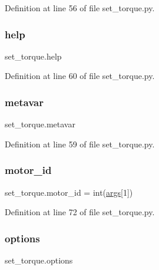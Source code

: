 Definition at line 56 of file set\+\_\+torque.\+py.

\mbox{\label{namespaceset__torque_af4b7186d080600dac5aab579c38b1e26}} 
\subsubsection{\texorpdfstring{help}{help}}
{\footnotesize\ttfamily set\+\_\+torque.\+help}



Definition at line 60 of file set\+\_\+torque.\+py.

\mbox{\label{namespaceset__torque_a57041a13e660a42e4474b41d25d80afd}} 
\subsubsection{\texorpdfstring{metavar}{metavar}}
{\footnotesize\ttfamily set\+\_\+torque.\+metavar}



Definition at line 59 of file set\+\_\+torque.\+py.

\mbox{\label{namespaceset__torque_a92f4588eb1a86aa95b83ae635853ae61}} 
\subsubsection{\texorpdfstring{motor\+\_\+id}{motor\_id}}
{\footnotesize\ttfamily set\+\_\+torque.\+motor\+\_\+id = int(\hyperlink{namespaceset__torque_a3021c459017eab874ec0a0da88be61f0}{args}\mbox{[}1\mbox{]})}



Definition at line 72 of file set\+\_\+torque.\+py.

\mbox{\label{namespaceset__torque_a0b961e29ab6d708b77dab37ac082ee90}} 
\subsubsection{\texorpdfstring{options}{options}}
{\footnotesize\ttfamily set\+\_\+torque.\+options}



